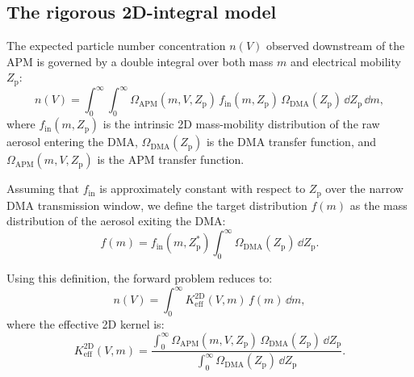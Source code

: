 \documentclass[11pt,a4paper]{article}
\begin{document}
\subsection{The rigorous 2D-integral model}
\label{sec:2d-model}

The expected particle number concentration $n(V)$ observed downstream of the
APM is governed by a double integral over both mass $m$ and electrical
mobility $Z_{\mathrm{p}}$:
\begin{equation}
  n(V) = \int_{0}^{\infty}\!\int_{0}^{\infty}
    \Omega_{\mathrm{APM}}(m, V, Z_{\mathrm{p}}) \,
    f_{\mathrm{in}}(m, Z_{\mathrm{p}}) \,
    \Omega_{\mathrm{DMA}}(Z_{\mathrm{p}}) \,
    \dd Z_{\mathrm{p}} \, \dd m,
  \label{eq:2d-forward}
\end{equation}
where $f_{\mathrm{in}}(m, Z_{\mathrm{p}})$ is the intrinsic 2D
mass-mobility distribution of the raw aerosol entering the DMA,
$\Omega_{\mathrm{DMA}}(Z_{\mathrm{p}})$ is the DMA transfer function, and
$\Omega_{\mathrm{APM}}(m, V, Z_{\mathrm{p}})$ is the APM transfer function.

Assuming that $f_{\mathrm{in}}$ is approximately constant with respect to
$Z_{\mathrm{p}}$ over the narrow DMA transmission window, we define the
target distribution $f(m)$ as the mass distribution of the aerosol exiting
the DMA:
\begin{equation}
  f(m) = f_{\mathrm{in}}(m, Z_{\mathrm{p}}^{*})
    \int_{0}^{\infty} \Omega_{\mathrm{DMA}}(Z_{\mathrm{p}}) \,
    \dd Z_{\mathrm{p}}.
  \label{eq:target-distribution}
\end{equation}

Using this definition, the forward problem reduces to:
\begin{equation}
  n(V) = \int_{0}^{\infty}
    K_{\mathrm{eff}}^{\mathrm{2D}}(V, m) \, f(m) \, \dd m,
  \label{eq:2d-reduced}
\end{equation}
where the effective 2D kernel is:
\begin{equation}
  K_{\mathrm{eff}}^{\mathrm{2D}}(V, m) =
    \frac{\displaystyle\int_{0}^{\infty}
      \Omega_{\mathrm{APM}}(m, V, Z_{\mathrm{p}}) \,
      \Omega_{\mathrm{DMA}}(Z_{\mathrm{p}}) \,
      \dd Z_{\mathrm{p}}}
    {\displaystyle\int_{0}^{\infty}
      \Omega_{\mathrm{DMA}}(Z_{\mathrm{p}}) \,
      \dd Z_{\mathrm{p}}}.
  \label{eq:2d-kernel}
\end{equation}
\end{document}
